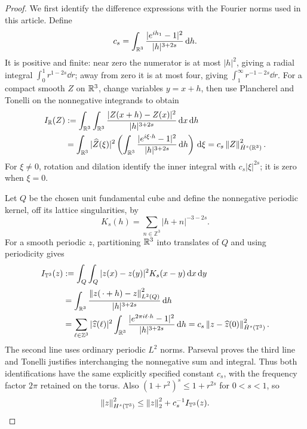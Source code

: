 \begin{proof}
We first identify the difference expressions with the Fourier norms used
in this article. Define
\[
 c_s=\int_{\mathbb R^3}\frac{|e^{ih_1}-1|^2}{|h|^{3+2s}}\,\mathrm d h.
\]
It is positive and finite: near zero the numerator is at most $|h|^2$,
giving a radial integral $\int_0^1r^{1-2s}\dd r$; away from zero it is at
most four, giving $\int_1^\infty r^{-1-2s}\dd r$.
For a compact smooth $Z$ on $\mathbb R^3$, change variables $y=x+h$, then use
Plancherel and Tonelli on the nonnegative integrands to obtain
\begin{align*}
 I_{\mathbb R}(Z)&:=\int_{\mathbb R^3}\int_{\mathbb R^3}
       \frac{|Z(x+h)-Z(x)|^2}{|h|^{3+2s}}\,\mathrm d x\,\mathrm d h\\
 &=\int_{\mathbb R^3}|\widehat Z(\xi)|^2
       \left(\int_{\mathbb R^3}\frac{|e^{i\xi\cdot h}-1|^2}
                                      {|h|^{3+2s}}\,\mathrm d h\right)\,\mathrm d\xi
 =c_s\left\lVert Z\right\rVert_{\dot H^s(\mathbb R^3)}^2.
\end{align*}
For $\xi\ne0$, rotation and dilation identify the inner integral with
$c_s|\xi|^{2s}$; it is zero when $\xi=0$.

Let $Q$ be the chosen unit fundamental cube and define the nonnegative
periodic kernel, off its lattice singularities, by
\[
 K_s(h)=\sum_{n\in\mathbb Z^3}|h+n|^{-3-2s}.
\]
For a smooth periodic $z$, partitioning $\mathbb R^3$ into translates of $Q$ and
using periodicity gives
\begin{align*}
 I_{\mathbb T^3}(z)&:=\int_Q\int_Q|z(x)-z(y)|^2K_s(x-y)\,\mathrm d x\,\mathrm d y\\
 &=\int_{\mathbb R^3}\frac{\left\lVert z(\,\cdot+h)-z\right\rVert_{L^2(Q)}^2}
                            {|h|^{3+2s}}\,\mathrm d h\\
 &=\sum_{\ell\in\mathbb Z^3}|\widehat z(\ell)|^2
       \int_{\mathbb R^3}\frac{|e^{2\pi i\ell\cdot h}-1|^2}
                            {|h|^{3+2s}}\,\mathrm d h
 =c_s\left\lVert z-\widehat z(0)\right\rVert_{\dot H^s(\mathbb T^3)}^2.
\end{align*}
The second line uses ordinary periodic $L^2$ norms. Parseval proves the
third line and Tonelli justifies interchanging the nonnegative sum and
integral. Thus both identifications have the same explicitly specified
constant $c_s$, with the frequency factor $2\pi$ retained on the torus.
Also $(1+r^2)^s\le1+r^{2s}$ for $0<s<1$, so
\[
 \left\lVert z\right\rVert_{H^s(\mathbb T^3)}^2
 \le\left\lVert z\right\rVert_2^2+c_s^{-1}I_{\mathbb T^3}(z).
\]


\end{proof}
